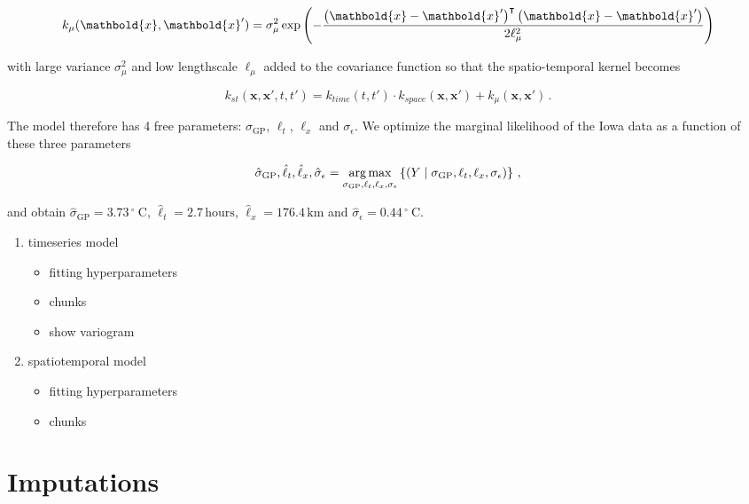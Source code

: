 \documentclass[letter]{article}
\providecommand{\tightlist}{%
      \setlength{\itemsep}{0pt}\setlength{\parskip}{0pt}}
\newcommand{\genericdel}[3]{%
      \left#1#3\right#2
    }
\newcommand{\del}[1]{\genericdel(){#1}}
\newcommand{\cbr}[1]{\genericdel\{\}{#1}}
\DeclareMathOperator*{\argmax}{arg\,max}
\let\Pr\relax
\DeclareMathOperator{\Pr}{\mathbb{P}}
\newcommand{\xvec}{\mathbold{x}}
\newcommand{\trans}{^{\intercal}}
\newcommand{\sigmaf}{\sigma_{\mathrm{GP}}}
\newcommand{\sigman}{\sigma_{\epsilon}}
\newcommand{\degreeC}{{}^{\circ}~\mathrm{C}}
\providecommand{\tightlist}{%
  	  \setlength{\itemsep}{0pt}\setlength{\parskip}{0pt}}
\begin{document}
\begin{equation}
    k_{\mu}(\xvec, \xvec') = \sigma_\mu^2 \exp\del{-\frac{\del{\xvec-\xvec'}\trans\del{\xvec-\xvec'}}{2\ell_\mu^2}}
\end{equation}

with large variance \(\sigma_\mu^2\) and low lengthscale \(\ell_\mu\)
added to the covariance function so that the spatio-temporal kernel
becomes

\begin{equation}
    k_{st}(\xvec,\xvec',t,t') = k_{time}(t,t') \cdot k_{space}(\xvec, \xvec') + k_\mu(\xvec, \xvec') \,.
\end{equation}

The model therefore has 4 free parameters: \(\sigmaf\), \(\ell_t\),
\(\ell_x\) and \(\sigman\). We optimize the marginal likelihood of the
Iowa data as a function of these three parameters

\begin{equation}
\label{eq:optimization}
\hat\sigmaf,\hat\ell_t,\hat\ell_x,\hat\sigman = \argmax_{\sigmaf,\ell_t,\ell_x,\sigman} \cbr{ \Pr\del{ Y \mid {\sigmaf,\ell_t,\ell_x,\sigman} } }\,,
\end{equation}

and obtain \(\hat\sigmaf=3.73\,\degreeC\),
\(\hat\ell_t=2.7\,\mathrm{hours}\), \(\hat\ell_x=176.4\,\mathrm{km}\)
and \(\hat\sigman=0.44\,\degreeC\).
    


    	\begin{enumerate}
\def\labelenumi{\arabic{enumi}.}
\tightlist
\item
  timeseries model

  \begin{itemize}
  \tightlist
  \item
    fitting hyperparameters
  \item
    chunks
  \item
    show variogram
  \end{itemize}
\item
  spatiotemporal model

  \begin{itemize}
  \tightlist
  \item
    fitting hyperparameters
  \item
    chunks
  \end{itemize}
\end{enumerate}
    


    	\section{Imputations}\label{imputations}
\end{document}
